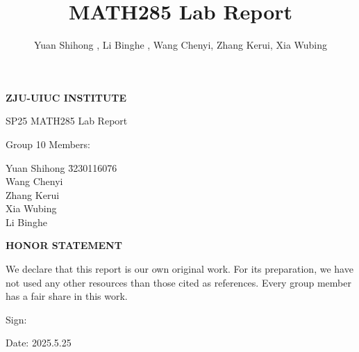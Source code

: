 \documentclass{article}
\title{MATH285 Lab Report}
\author{Yuan Shihong , Li Binghe , Wang Chenyi, Zhang Kerui, Xia Wubing}
\begin{document}
\begin{titlepage}
    \centering
    \vspace*{2cm}
    
    \Huge
    \textbf{ZJU-UIUC INSTITUTE}
    
    \vspace{0.5cm}
    \LARGE
    SP25 MATH285 Lab Report
    
    \vspace{1.5cm}
    
    \Large
    Group 10 Members:
    
    \vspace{0.5cm}
    \begin{minipage}{0.6\textwidth}
    \centering
    \begin{tabbing}
    Yuan Shihong \hspace{2cm} \= 3230116076 \\
    Wang Chenyi  \\
    Zhang Kerui  \\
    Xia Wubing  \\
    Li Binghe  \\
    \end{tabbing}
    \end{minipage}

    \vspace{2cm}
    
    \Large
    \textbf{HONOR STATEMENT}
    
    \vspace{0.5cm}
    
    \normalsize
    We declare that this report is our own original work. For its preparation, we have not used any other resources than those cited as references. Every group member has a fair share in this work.
    
    \vspace{2cm}
    
    \begin{flushleft}
    \large
    Sign:
    
    \vspace{1.5cm}
    
    Date: 2025.5.25
    \end{flushleft}



    
\end{titlepage}


\maketitle
\end{document}
